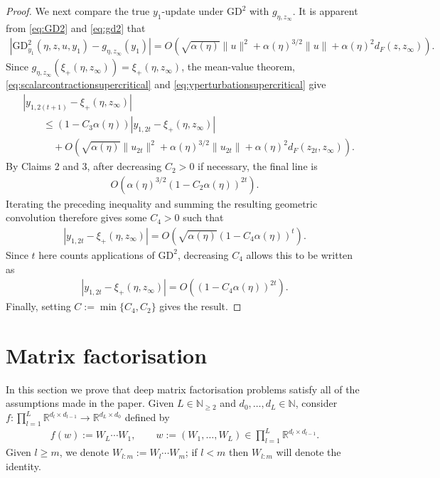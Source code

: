 \documentclass{article}
\newcommand{\RB}{\mathbb{R}}
\newcommand{\NB}{\mathbb{N}}
\newcommand{\GD}{\mathrm{GD}}
\theoremstyle{plain}
\theoremstyle{definition}
\theoremstyle{remark}
\begin{document}
\begin{proof}
    We next compare the true $y_1$-update under $\GD^2$ with $g_{\eta,z_\infty}$. It is apparent from \eqref{eq:GD2} and \eqref{eq:gd2} that
    \begin{align}\label{eq:yperturbationsupercritical}
        \left|
        \GD_{y_1}^2(\eta,z,u,y_1)
        -g_{\eta,z_\infty}(y_1)
        \right|= O\left(
        \sqrt{\alpha(\eta)}\|u\|^2
        +\alpha(\eta)^{3/2}\|u\|
        +\alpha(\eta)^2d_F(z,z_\infty)
        \right).
    \end{align}
    Since $g_{\eta,z_\infty}(\xi_+(\eta,z_\infty))=\xi_+(\eta,z_\infty)$, the mean-value theorem, \eqref{eq:scalarcontractionsupercritical} and \eqref{eq:yperturbationsupercritical} give
    \begin{align}
        &|y_{1,2(t+1)}-\xi_+(\eta,z_\infty)|\\
        &\qquad\leq
        (1-C_3\alpha(\eta))
        |y_{1,2t}-\xi_+(\eta,z_\infty)|\\
        &\qquad\quad+
        O\left(
        \sqrt{\alpha(\eta)}\|u_{2t}\|^2
        +\alpha(\eta)^{3/2}\|u_{2t}\|
        +\alpha(\eta)^2d_F(z_{2t},z_\infty)
        \right).
    \end{align}
    By Claims 2 and 3, after decreasing $C_2>0$ if necessary, the final line is
    \begin{align}
        O\left(\alpha(\eta)^{3/2}(1-C_2\alpha(\eta))^{2t}\right).
    \end{align}
    Iterating the preceding inequality and summing the resulting geometric convolution therefore gives some $C_4>0$ such that
    \begin{align}
        |y_{1,2t}-\xi_+(\eta,z_\infty)|
        =
        O\left(\sqrt{\alpha(\eta)}(1-C_4\alpha(\eta))^t\right).
    \end{align}
    Since $t$ here counts applications of $\GD^2$, decreasing $C_4$ allows this to be written as
    \begin{align}
        |y_{1,2t}-\xi_+(\eta,z_\infty)|
        =
        O\left((1-C_4\alpha(\eta))^{2t}\right).
    \end{align}
    Finally, setting $C:=\min\{C_4,C_2\}$ gives the result.
\end{proof}

\section{Matrix factorisation}\label{sec:matrixfactorisation}

In this section we prove that deep matrix factorisation problems satisfy all of the assumptions made in the paper. Given $L\in\NB_{\geq 2}$ and $d_0,\dots,d_L\in\NB$, consider $f:\prod_{l=1}^{L}\RB^{d_l\times d_{l-1}}\rightarrow \RB^{d_L\times d_0}$ defined by
\begin{align}\label{eq:matrixfactorisationf}
f(w):=W_L\cdots W_1,\qquad w:=(W_1,\dots,W_L)\in \prod_{l=1}^{L}\RB^{d_l\times d_{l-1}}.
\end{align}
Given $l\geq m$, we denote $W_{l:m}:=W_l\cdots W_m$; if $l<m$ then $W_{l:m}$ will denote the identity. 
\end{document}
